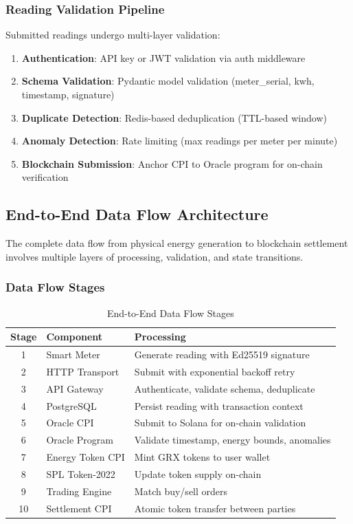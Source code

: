 \documentclass[conference]{IEEEtran}
\begin{document}
\subsubsection{Reading Validation Pipeline}

Submitted readings undergo multi-layer validation:

\begin{enumerate}
    \item \textbf{Authentication}: API key or JWT validation via auth middleware
    \item \textbf{Schema Validation}: Pydantic model validation (meter\_serial, kwh, timestamp, signature)
    \item \textbf{Duplicate Detection}: Redis-based deduplication (TTL-based window)
    \item \textbf{Anomaly Detection}: Rate limiting (max readings per meter per minute)
    \item \textbf{Blockchain Submission}: Anchor CPI to Oracle program for on-chain verification
\end{enumerate}

\subsection{End-to-End Data Flow Architecture}

The complete data flow from physical energy generation to blockchain settlement involves multiple layers of processing, validation, and state transitions.

\subsubsection{Data Flow Stages}

\begin{table}[htbp]
\caption{End-to-End Data Flow Stages}
\begin{center}
\begin{tabular}{clp{8cm}}
\toprule
\textbf{Stage} & \textbf{Component} & \textbf{Processing} \\
\midrule
1 & Smart Meter & Generate reading with Ed25519 signature \\
2 & HTTP Transport & Submit with exponential backoff retry \\
3 & API Gateway & Authenticate, validate schema, deduplicate \\
4 & PostgreSQL & Persist reading with transaction context \\
5 & Oracle CPI & Submit to Solana for on-chain validation \\
6 & Oracle Program & Validate timestamp, energy bounds, anomalies \\
7 & Energy Token CPI & Mint GRX tokens to user wallet \\
8 & SPL Token-2022 & Update token supply on-chain \\
9 & Trading Engine & Match buy/sell orders \\
10 & Settlement CPI & Atomic token transfer between parties \\
\bottomrule
\end{tabular}
\label{tab:dataflow}
\end{center}
\end{table}
\end{document}
